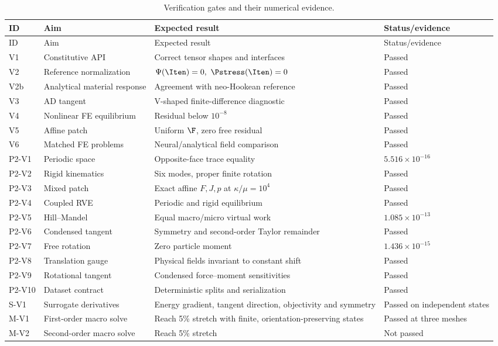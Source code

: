 \begin{longtable}{@{}p{}p{}p{}p{}@{}}
\caption{Verification gates and their numerical evidence.}
\label{tab:verification-matrix}\\
\toprule
ID & Aim & Expected result & Status/evidence\\
\midrule
\endfirsthead
\toprule
ID & Aim & Expected result & Status/evidence\\
\midrule
\endhead
V1 & Constitutive API & Correct tensor shapes and interfaces & Passed\\
V2 & Reference normalization & \(\Psi(\Iten)=0,\ \Pstress(\Iten)=0\) & Passed\\
V2b & Analytical material response & Agreement with neo-Hookean reference & Passed\\
V3 & AD tangent & V-shaped finite-difference diagnostic & Passed\\
V4 & Nonlinear FE equilibrium & Residual below \(10^{-8}\) & Passed\\
V5 & Affine patch & Uniform \(\F\), zero free residual & Passed\\
V6 & Matched FE problems & Neural/analytical field comparison & Passed\\
P2-V1 & Periodic space & Opposite-face trace equality & \(5.516\times10^{-16}\)\\
P2-V2 & Rigid kinematics & Six modes, proper finite rotation & Passed\\
P2-V3 & Mixed patch & Exact affine \(F,J,p\) at \(\kappa/\mu=10^4\) & Passed\\
P2-V4 & Coupled RVE & Periodic and rigid equilibrium & Passed\\
P2-V5 & Hill--Mandel & Equal macro/micro virtual work & \(1.085\times10^{-13}\)\\
P2-V6 & Condensed tangent & Symmetry and second-order Taylor remainder & Passed\\
P2-V7 & Free rotation & Zero particle moment & \(1.436\times10^{-15}\)\\
P2-V8 & Translation gauge & Physical fields invariant to constant shift & Passed\\
P2-V9 & Rotational tangent & Condensed force--moment sensitivities & Passed\\
P2-V10 & Dataset contract & Deterministic splits and serialization & Passed\\
S-V1 & Surrogate derivatives & Energy gradient, tangent direction, objectivity
and symmetry & Passed on independent states\\
M-V1 & First-order macro solve & Reach 5\% stretch with finite,
orientation-preserving states & Passed at three meshes\\
M-V2 & Second-order macro solve & Reach 5\% stretch & Not passed\\
\bottomrule
\end{longtable}

